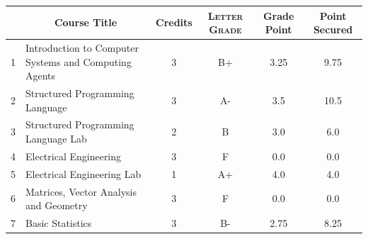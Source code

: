 \documentclass[11pt]{article}
\newcommand*{\numtwo}[1]{\pgfmathprintnumber[
                    fixed, precision=2, fixed zerofill=true]{#1}}
\begin{document}
                \begin{center}
                    \renewcommand{\arraystretch}{1.08}
                    
                \begin{tabular}{|c|l|c|>{\scshape}c|c|c|}
                \hline  \rule[-1ex]{0pt}{3.5ex} {\centering{\bf Course Code}} &  \multicolumn{1}{c|}{\textbf{Course Title}}  & {\bf Credits} & {\bf Letter Grade} & {\bf Grade Point} & {\bf Point Secured}  \\ 
                \hline   1 &  Introduction to Computer Systems and Computing Agents		 & 3 & B+ & 3.25 & 9.75 \\ %
                \hline   2 &  Structured Programming Language		 & 3 & A- & 3.5 & 10.5 \\ %
                \hline   3 &  Structured Programming Language Lab		 & 2 & B & 3.0 & 6.0 \\ %
                \hline   4 &  Electrical Engineering		 & 3 & F & 0.0 & 0.0 \\ %
                \hline   5 &  Electrical Engineering Lab		 & 1 & A+ & 4.0 & 4.0 \\ %
                \hline   6 &  Matrices, Vector Analysis and Geometry		 & 3 & F & 0.0 & 0.0 \\ %
                \hline   7 &  Basic Statistics		 & 3 & B- & 2.75 & 8.25 \\ %

\hline                %
                \end{tabular}
                \end{center}
                \renewcommand{\arraystretch}{1.03}
\end{document}
